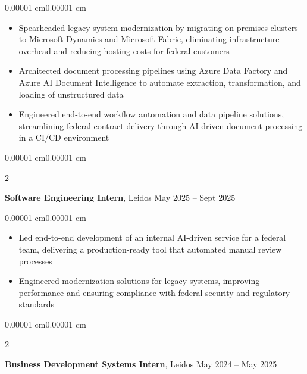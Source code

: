 \documentclass[10pt, letterpaper]{article}
\newenvironment{highlights}{
    \begin{itemize}[
        topsep=0.05 cm,
        parsep=0.05 cm,
        partopsep=0pt,
        itemsep=0pt,
        leftmargin=10pt
    ]
}{
    \end{itemize}
}
\newenvironment{onecolentry}{
    \begin{adjustwidth}{0.00001 cm}{0.00001 cm}
}{
    \end{adjustwidth}
}
\newenvironment{twocolentry}[2][]{
    \onecolentry
    \def\secondColumn{#2}
    \setcolumnwidth{\fill, 4.5 cm}
    \begin{paracol}{2}
}{
    \switchcolumn \raggedleft \secondColumn
    \end{paracol}
    \endonecolentry
}
\begin{document}
        \vspace{0.05 cm}
        \begin{onecolentry}
            \begin{highlights}
                \item Spearheaded legacy system modernization by migrating on-premises clusters to Microsoft Dynamics and Microsoft Fabric, eliminating infrastructure overhead and reducing hosting costs for federal customers
                \item Architected document processing pipelines using Azure Data Factory and Azure AI Document Intelligence to automate extraction, transformation, and loading of unstructured data
                \item Engineered end-to-end workflow automation and data pipeline solutions, streamlining federal contract delivery through AI-driven document processing in a CI/CD environment
            \end{highlights}
        \end{onecolentry}

        \vspace{0.1 cm}

        \begin{twocolentry}{
            May 2025 -- Sept 2025
        }
            \textbf{Software Engineering Intern}, Leidos\end{twocolentry}

        \vspace{0.05 cm}
        \begin{onecolentry}
            \begin{highlights}
                \item Led end-to-end development of an internal AI-driven service for a federal team, delivering a production-ready tool that automated manual review processes
                \item Engineered modernization solutions for legacy systems, improving performance and ensuring compliance with federal security and regulatory standards
            \end{highlights}
        \end{onecolentry}

        \vspace{0.1 cm}

        \begin{twocolentry}{
            May 2024 -- May 2025
        }
            \textbf{Business Development Systems Intern}, Leidos\end{twocolentry}
\end{document}
